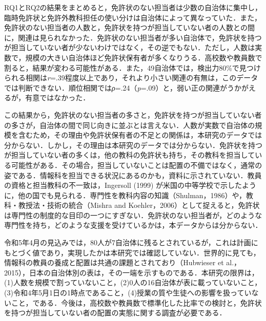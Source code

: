\documentclass[a4paper,10pt,twocolumn]{ltjsarticle}
\makeatletter
\renewcommand{\section}{\@startsection{section}{1}{\z@}{1.1\Cvs \@plus.4\Cdp \@minus.2\Cdp}{.5\Cvs \@plus.2\Cdp}{\normalfont\gtfamily\bfseries\large}}
\makeatother
\begin{document}
\section{考察}
RQ1とRQ2の結果をまとめると，免許状のない担当者は少数の自治体に集中し，臨時免許状と免許外教科担任の使い分けは自治体によって異なっていた．また，免許状のない担当者の人数と，免許状を持つが担当していない者の人数との間に，関連は見られなかった．免許状のない担当者が多い自治体で，免許状を持つが担当していない者が少ないわけではなく，その逆でもない．ただし，人数は実数で，規模の大きい自治体ほど免許状保有者が多くなりうる．高校数や教員数で割ると，結果が変わる可能性がある．また，49自治体では，検出力80\%で見つけられる相関は\textit{r}=.39程度以上であり，それより小さい関連の有無は，このデータでは判断できない．順位相関では\textit{ρ}=.24（\textit{p}=.09）と，弱い正の関連がうかがえるが，有意ではなかった．

この結果から，免許状のない担当者の多さと，免許状を持つが担当していない者の多さが，自治体の間で同じ向きに並ぶとは言えない．人数が実数で自治体の規模を含むため，その理由や免許状保有者の不足との関係は，本研究のデータでは分からない．しかし，その理由は本研究のデータでは分からない．免許状を持つが担当していない者の多くは，他の教科の免許状も持ち，その教科を担当している可能性がある．その場合，担当していないことは配置の不備ではなく，通常の姿である．情報科を担当できる状況にあるのかも，資料に示されていない．教員の資格と担当教科の不一致は，Ingersoll (1999) が米国の中等学校で示したように，他の国でも見られる．専門性を教科内容の知識（Shulman，1986）や，教科・教授法・技術の統合（Mishra and Koehler，2006）として捉えると，免許状は専門性の制度的な目印の一つにすぎない．免許状のない担当者が，どのような専門性を持ち，どのような支援を受けているかは，本データからは分からない．

令和5年4月の見込みでは，80人が7自治体に残るとされているが，これは計画にもとづく値であり，実現したかは本研究では確認していない．世界的に見ても，情報科の教員の養成と配置は共通の課題とされており（Hubwieser et al.，2015），日本の自治体別の表は，その一端を示すものである．本研究の限界は，(1)人数を規模で割っていないこと，(2)0人の16自治体が表に載っていないこと，(3)令和4年5月1日の1時点であること，(4)授業の質や生徒への影響を扱っていないこと，である．今後は，高校数や教員数で標準化した比率での検討と，免許状を持つが担当していない者の配置の実態に関する調査が必要である．
\end{document}
